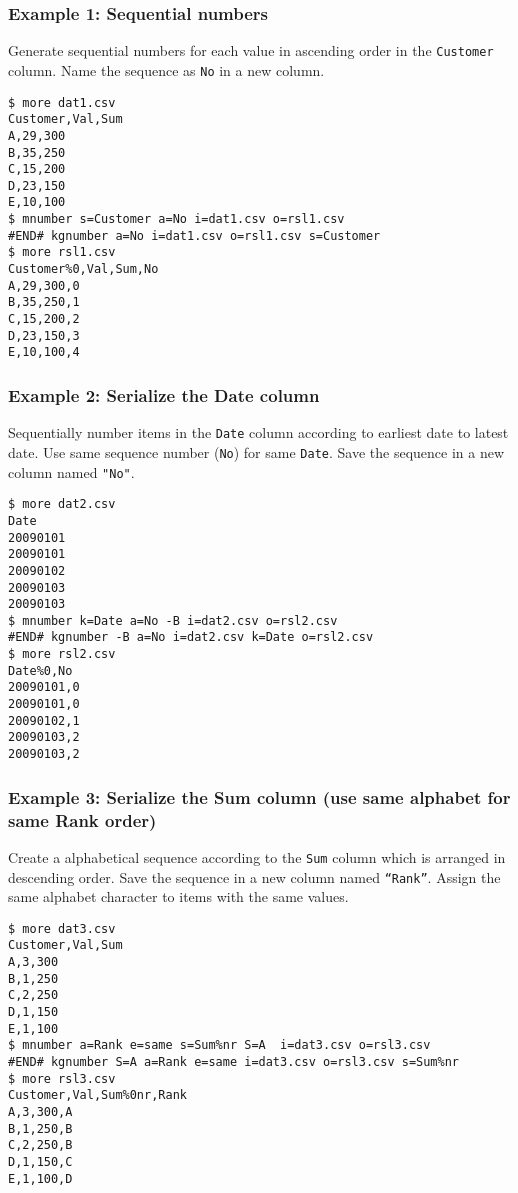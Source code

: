 \subsubsection*{Example 1: Sequential numbers}

Generate sequential numbers for each value in ascending order in the \verb|Customer| column. Name the sequence as \verb|No| in a new column.


\begin{Verbatim}[baselinestretch=0.7,frame=single]
$ more dat1.csv
Customer,Val,Sum
A,29,300
B,35,250
C,15,200
D,23,150
E,10,100
$ mnumber s=Customer a=No i=dat1.csv o=rsl1.csv
#END# kgnumber a=No i=dat1.csv o=rsl1.csv s=Customer
$ more rsl1.csv
Customer%0,Val,Sum,No
A,29,300,0
B,35,250,1
C,15,200,2
D,23,150,3
E,10,100,4
\end{Verbatim}
\subsubsection*{Example 2: Serialize the Date column}

Sequentially number items in the \verb|Date| column according to earliest date to latest date. Use same sequence number (\verb|No|) for same \verb|Date|. Save the sequence in a new column named \verb|"No"|.


\begin{Verbatim}[baselinestretch=0.7,frame=single]
$ more dat2.csv
Date
20090101
20090101
20090102
20090103
20090103
$ mnumber k=Date a=No -B i=dat2.csv o=rsl2.csv
#END# kgnumber -B a=No i=dat2.csv k=Date o=rsl2.csv
$ more rsl2.csv
Date%0,No
20090101,0
20090101,0
20090102,1
20090103,2
20090103,2
\end{Verbatim}
\subsubsection*{Example 3: Serialize the Sum column (use same alphabet for same Rank order)}

Create a alphabetical sequence according to the \verb|Sum| column which is arranged in descending order. Save the sequence in a new column named \verb|“Rank”|. Assign the same alphabet character to items with the same values.


\begin{Verbatim}[baselinestretch=0.7,frame=single]
$ more dat3.csv
Customer,Val,Sum
A,3,300
B,1,250
C,2,250
D,1,150
E,1,100
$ mnumber a=Rank e=same s=Sum%nr S=A  i=dat3.csv o=rsl3.csv
#END# kgnumber S=A a=Rank e=same i=dat3.csv o=rsl3.csv s=Sum%nr
$ more rsl3.csv
Customer,Val,Sum%0nr,Rank
A,3,300,A
B,1,250,B
C,2,250,B
D,1,150,C
E,1,100,D
\end{Verbatim}
